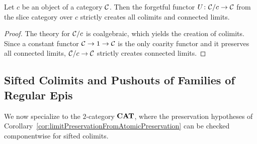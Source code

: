 \begin{corollary}
   Let $c$ be an object of a category $\mathcal{C}$. Then the forgetful functor $U\colon \mathcal{C}/c\to \mathcal{C}$ from the slice category over $c$ strictly creates all colimits and connected limits.
\end{corollary}
\begin{proof}
   The theory for $\mathcal{C}/c$ is coalgebraic, which yields the creation of colimits. Since a constant functor $\mathcal{C}\to 1\to \mathcal{C}$ is the only coarity functor and it preserves all connected limits, $\mathcal{C}/c\to \mathcal{C}$ strictly creates connected limits.
\end{proof}

\subsection{Sifted Colimits and Pushouts of Families of Regular Epis}\label{subsec:sifted}

We now specialize to the $2$-category $\mathbf{CAT}$, where the preservation hypotheses of Corollary~\ref{cor:limitPreservationFromAtomicPreservation} can be checked componentwise for sifted colimits.

